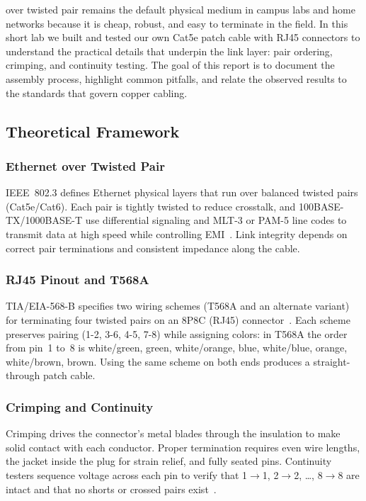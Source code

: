  over twisted pair remains the default physical medium
in campus labs and home networks because it is cheap, robust, and easy to
terminate in the field. In this short lab we built and tested our own Cat5e
patch cable with RJ45 connectors to understand the practical details that
underpin the link layer: pair ordering, crimping, and continuity testing. The
goal of this report is to document the assembly process, highlight common
pitfalls, and relate the observed results to the standards that govern copper
cabling.

\subsection{Theoretical Framework}
\subsubsection{Ethernet over Twisted Pair}
IEEE~802.3 defines Ethernet physical layers that run over balanced twisted
pairs (Cat5e/Cat6). Each pair is tightly twisted to reduce crosstalk, and
100BASE-TX/1000BASE-T use differential signaling and MLT-3 or PAM-5 line codes
to transmit data at high speed while controlling EMI~\cite{ieee8023}. Link
integrity depends on correct pair terminations and consistent impedance along
the cable.

\subsubsection{RJ45 Pinout and T568A}
TIA/EIA-568-B specifies two wiring schemes (T568A and an alternate variant) for
terminating four twisted pairs on an 8P8C (RJ45) connector~\cite{tia568b}. Each
scheme preserves pairing (1-2, 3-6, 4-5, 7-8) while assigning colors: in T568A
the order from pin~1 to~8 is white/green, green, white/orange, blue,
white/blue, orange, white/brown, brown. Using the same scheme on both ends
produces a straight-through patch cable.

\subsubsection{Crimping and Continuity}
Crimping drives the connector's metal blades through the insulation to make
solid contact with each conductor. Proper termination requires even wire
lengths, the jacket inside the plug for strain relief, and fully seated pins.
Continuity testers sequence voltage across each pin to verify that 1$\rightarrow$1,
2$\rightarrow$2, \dots, 8$\rightarrow$8 are intact and that no shorts or
crossed pairs exist~\cite{fluketest}.

